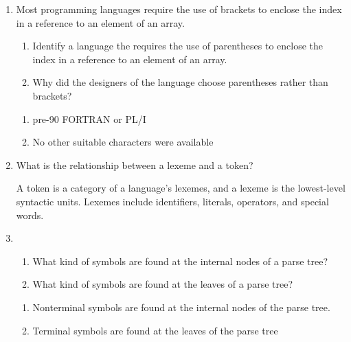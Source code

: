 

\begin{enumerate}
  \item Most programming languages require the use of brackets to
    enclose the index in a reference to an element of an array.
  \begin{enumerate}
    \item Identify a language the requires the use of parentheses
      to enclose the index in a reference to an element of an array.
    \item Why did the designers of the language choose parentheses
      rather than brackets?
    \end{enumerate}

  \begin{answer}

  \begin{enumerate}
    \item pre-90 FORTRAN or PL/I
    \item No other suitable characters were available
    \end{enumerate}

    \end{answer}
    
  \item What is the relationship between a lexeme and a token?

  \begin{answer}

    A token is a category of a language's lexemes, and a lexeme is
    the lowest-level syntactic units. Lexemes include identifiers, 
    literals, operators, and special words.

    \end{answer}

  \item
  \begin{enumerate}
    \item What kind of symbols are found at the internal nodes of a
      parse tree?
    \item What kind of symbols are found at the leaves of a parse tree?
    \end{enumerate}

  \begin{answer}

  \begin{enumerate}
    \item Nonterminal symbols are found at the internal nodes of the
	parse tree.
    \item Terminal symbols are found at the leaves of the parse tree
    \end{enumerate}


\end{answer}
\end{enumerate}
